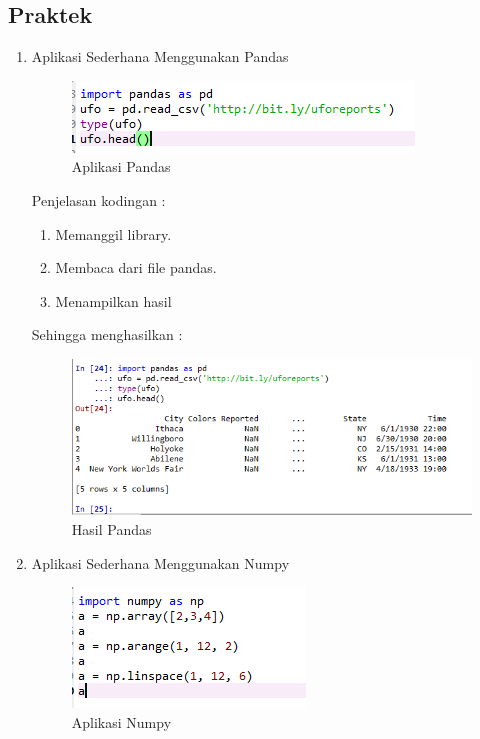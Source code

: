 \subsection{Praktek}
\begin{enumerate}
\item Aplikasi Sederhana Menggunakan Pandas
	\begin{figure}[ht]
	\centering
	\includegraphics[scale=0.5]{figures/AIP/ai1.PNG}
	\caption{Aplikasi Pandas}
	\label{contoh}
	\end{figure}
	\par Penjelasan kodingan :
		\begin{enumerate}
		\item Memanggil library.
		\item Membaca dari file pandas.
		\item Menampilkan hasil
		\end{enumerate}
	\par Sehingga menghasilkan :
	\begin{figure}[ht]
	\centering
	\includegraphics[scale=0.5]{figures/AIP/ai2.PNG}
	\caption{Hasil Pandas}
	\label{contoh}
	\end{figure}
\item Aplikasi Sederhana Menggunakan Numpy
	\begin{figure}[ht]
	\centering
	\includegraphics[scale=0.5]{figures/AIP/ai3.PNG}
	\caption{Aplikasi Numpy}
	\label{contoh}
	\end{figure}

\end{enumerate}
